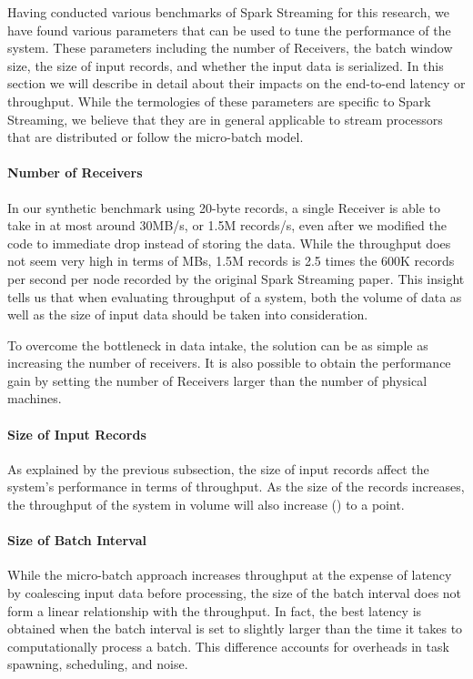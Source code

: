 Having conducted various benchmarks of Spark Streaming for this research, we have found various parameters that can be used to tune the performance of the system. These parameters including the number of Receivers, the batch window size, the size of input records, and whether the input data is serialized. In this section we will describe in detail about their impacts on the end-to-end latency or throughput. While the termologies of these parameters are specific to Spark Streaming, we believe that they are in general applicable to stream processors that are distributed or follow the micro-batch model.

\paragraph{Number of Receivers}
In our synthetic benchmark using 20-byte records, a single Receiver is able to take in at most around 30MB/s, or 1.5M records/s, even after we modified the code to immediate drop instead of storing the data. While the throughput does not seem very high in terms of MBs, 1.5M records is 2.5 times the 600K records per second per node recorded by the original Spark Streaming paper. This insight tells us that when evaluating throughput of a system, both the volume of data as well as the size of input data should be taken into consideration.

To overcome the bottleneck in data intake, the solution can be as simple as increasing the number of receivers. It is also possible to obtain the performance gain by setting the number of Receivers larger than the number of physical machines. 

\paragraph{Size of Input Records}
As explained by the previous subsection, the size of input records affect the system's performance in terms of throughput. As the size of the records increases, the throughput of the system in volume will also increase () to a point. 

\paragraph{Size of Batch Interval}
While the micro-batch approach increases throughput at the expense of latency by coalescing input data before processing, the size of the batch interval does not form a linear relationship with the throughput. In fact, the best latency is obtained when the batch interval is set to slightly larger than the time it takes to computationally process a batch. This difference accounts for overheads in task spawning, scheduling, and noise.

